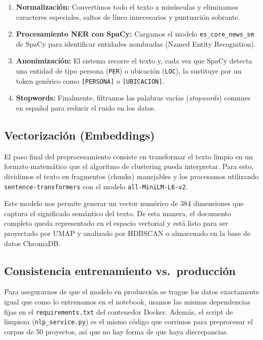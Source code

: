 \begin{enumerate}
  \item \textbf{Normalización:} Convertimos todo el texto a minúsculas y eliminamos caracteres especiales, saltos de línea innecesarios y puntuación sobrante.
  \item \textbf{Procesamiento NER con SpaCy:} Cargamos el modelo \texttt{es\_core\_news\_sm} de SpaCy para identificar entidades nombradas (Named Entity Recognition).
  \item \textbf{Anonimización:} El sistema recorre el texto y, cada vez que SpaCy detecta una entidad de tipo persona (\texttt{PER}) o ubicación (\texttt{LOC}), la sustituye por un token genérico como \texttt{[PERSONA]} o \texttt{[UBICACION]}.
  \item \textbf{Stopwords:} Finalmente, filtramos las palabras vacías (\textit{stopwords}) comunes en español para reducir el ruido en los datos.
\end{enumerate}

\subsection{Vectorización (Embeddings)}

El paso final del preprocesamiento consiste en transformar el texto limpio en un formato matemático que el algoritmo de clustering pueda interpretar. Para esto, dividimos el texto en fragmentos (chunks) manejables y los procesamos utilizando \texttt{sentence-transformers} con el modelo \texttt{all-MiniLM-L6-v2}. 

Este modelo nos permite generar un vector numérico de 384 dimensiones que captura el significado semántico del texto. De esta manera, el documento completo queda representado en el espacio vectorial y está listo para ser proyectado por UMAP y analizado por HDBSCAN o almacenado en la base de datos ChromaDB.

\subsection{Consistencia entrenamiento vs.\ producción}

Para asegurarnos de que el modelo en producción se trague los datos exactamente igual que como lo entrenamos en el notebook, usamos las mismas dependencias fijas en el \texttt{requirements.txt} del contenedor Docker. Además, el script de limpieza (\texttt{nlp\_service.py}) es el mismo código que corrimos para preprocesar el corpus de 50 proyectos, así que no hay forma de que haya discrepancias.

